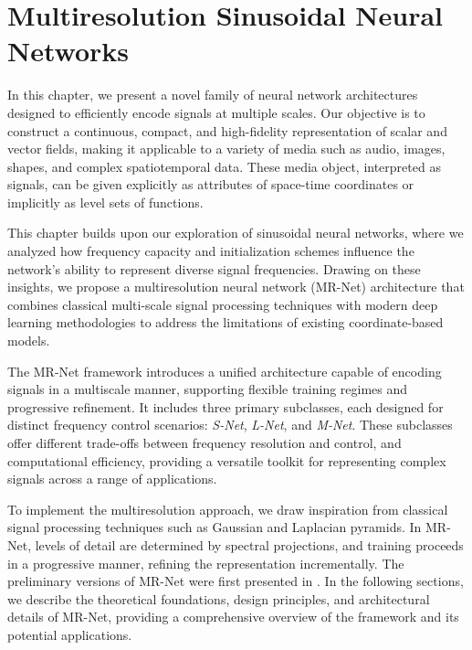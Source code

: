 \chapter{Multiresolution Sinusoidal Neural Networks}
\label{chap:mr_snn}

In this chapter, we present a novel family of neural network architectures designed to efficiently encode signals at multiple scales. Our objective is to construct a continuous, compact, and high-fidelity representation of scalar and vector fields, making it applicable to a variety of media such as audio, images, shapes, and complex spatiotemporal data. These media object, interpreted as signals, can be given explicitly as attributes of space-time coordinates or implicitly as level sets of functions.

This chapter builds upon our exploration of sinusoidal neural networks, where we analyzed how frequency capacity and initialization schemes influence the network's ability to represent diverse signal frequencies. Drawing on these insights, we propose a multiresolution neural network (MR-Net) architecture that combines classical multi-scale signal processing techniques with modern deep learning methodologies to address the limitations of existing coordinate-based models.

The MR-Net framework introduces a unified architecture capable of encoding signals in a multiscale manner, supporting flexible training regimes and progressive refinement. It includes three primary subclasses, each designed for distinct frequency control scenarios: \emph{S-Net}, \emph{L-Net}, and \emph{M-Net}. These subclasses offer different trade-offs between frequency resolution and control, and computational efficiency, providing a versatile toolkit for representing complex signals across a range of applications.

To implement the multiresolution approach, we draw inspiration from classical signal processing techniques such as Gaussian and Laplacian pyramids. In MR-Net, levels of detail are determined by spectral projections, and training proceeds in a progressive manner, refining the representation incrementally. The preliminary versions of MR-Net were first presented in \cite{paz2022,paz2023mr}. In the following sections, we describe the theoretical foundations, design principles, and architectural details of MR-Net, providing a comprehensive overview of the framework and its potential applications.


